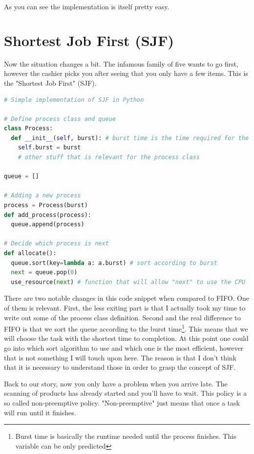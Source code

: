 \documentclass{report}
\newcounter{defi}[section]\setcounter{defi}{0}
\begin{document}
As you can see the implementation is itself pretty easy.
\pagebreak

\section{Shortest Job First (SJF)}

Now the situation changes a bit. 
The infamous family of five wants to go first, however the cashier picks you after seeing that you only have a few items.
This is the "Shortest Job First" (SJF). 

\begin{lstlisting}[language=Python, style=colorEX, label=cd:sjf-python]
# Simple implementation of SJF in Python

# Define process class and queue
class Process:
  def __init__(self, burst): # burst time is the time required for the process to finish
    self.burst = burst
    # other stuff that is relevant for the process class

queue = []

# Adding a new process
process = Process(burst) 
def add_process(process): 
  queue.append(process)

# Decide which process is next
def allocate():
  queue.sort(key=lambda a: a.burst) # sort according to burst
  next = queue.pop(0)
  use_resource(next) # function that will allow "next" to use the CPU
\end{lstlisting}

There are two notable changes in this code snippet when compared to FIFO. One of them is relevant.
First, the less exiting part is that I actually took my time to write out some of the process class definition.
Second and the real difference to FIFO is that we sort the queue according to the burst time\footnote{Burst time is basically the runtime needed until the process finishes. This variable can be only predicted}. 
This means that we will choose the task with the shortest time to completion.
At this point one could go into which sort algorithm to use and which one is the most efficient, however that is not something I will touch upon here.
The reason is that I don't think that it is necessary to understand those in order to grasp the concept of SJF.

Back to our story, now you only have a problem when you arrive late. The scanning of products has already started and you'll have to wait.
This policy is a so called non-preemptive policy.
"Non-preemptive" just means that once a task will run until it finishes.
\end{document}
